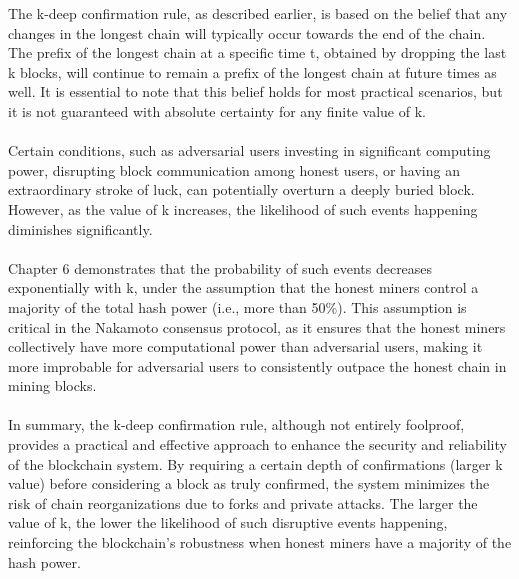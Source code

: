 The k-deep confirmation rule, as described earlier, is based on the belief that any changes in the longest chain will typically occur towards the end of the chain. The prefix of the longest chain at a specific time t, obtained by dropping the last k blocks, will continue to remain a prefix of the longest chain at future times as well. It is essential to note that this belief holds for most practical scenarios, but it is not guaranteed with absolute certainty for any finite value of k.\\\\
Certain conditions, such as adversarial users investing in significant computing power, disrupting block communication among honest users, or having an extraordinary stroke of luck, can potentially overturn a deeply buried block. However, as the value of k increases, the likelihood of such events happening diminishes significantly.\\\\
Chapter 6 demonstrates that the probability of such events decreases exponentially with k, under the assumption that the honest miners control a majority of the total hash power (i.e., more than 50\%). This assumption is critical in the Nakamoto consensus protocol, as it ensures that the honest miners collectively have more computational power than adversarial users, making it more improbable for adversarial users to consistently outpace the honest chain in mining blocks.\\\\
In summary, the k-deep confirmation rule, although not entirely foolproof, provides a practical and effective approach to enhance the security and reliability of the blockchain system. By requiring a certain depth of confirmations (larger k value) before considering a block as truly confirmed, the system minimizes the risk of chain reorganizations due to forks and private attacks. The larger the value of k, the lower the likelihood of such disruptive events happening, reinforcing the blockchain's robustness when honest miners have a majority of the hash power.\\\\
